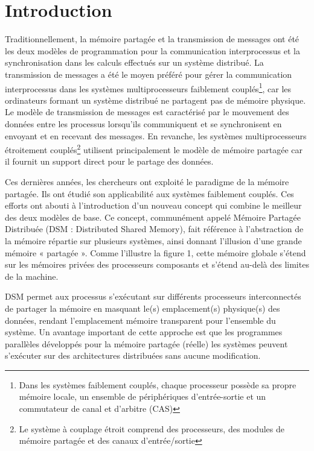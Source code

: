 \tableofcontents
\newpage
\baselineskip=18pt
\section{Introduction}
\setlength{\parindent}{5ex}
Traditionnellement, la mémoire partagée et la transmission de messages ont été les deux modèles de programmation pour la communication interprocessus et la synchronisation dans les calculs effectués sur un système distribué. La transmission de messages a été le moyen préféré pour gérer la communication interprocessus dans les systèmes multiprocesseurs faiblement couplés\footnote{Dans les systèmes faiblement couplés, chaque processeur possède sa propre mémoire locale, un ensemble de périphériques d’entrée-sortie et un commutateur de canal et d’arbitre (CAS)}, car les ordinateurs formant un système distribué ne partagent pas de mémoire physique. Le modèle de transmission de messages est caractérisé par le mouvement des données entre les
processus lorsqu'ils communiquent et se synchronisent en envoyant et en recevant des messages. En revanche, les systèmes multiprocesseurs étroitement couplés\footnote{Le système à couplage étroit comprend des processeurs, des modules de mémoire partagée et des canaux d’entrée/sortie} utilisent principalement le modèle de mémoire partagée car il fournit un support direct pour le partage des données.\par
Ces dernières années, les chercheurs ont exploité le paradigme de la mémoire partagée. Ils ont étudié son applicabilité aux systèmes faiblement couplés. Ces efforts ont abouti à l'introduction d'un nouveau concept qui combine le meilleur des deux modèles de base. Ce concept, communément appelé Mémoire Partagée Distribuée (DSM : Distributed Shared Memory), fait référence à l'abstraction de la mémoire répartie sur plusieurs systèmes, ainsi
donnant l'illusion d'une grande mémoire « partagée ». Comme l'illustre la figure 1, cette mémoire globale
s'étend sur les mémoires privées des processeurs composants et s'étend au-delà des limites de la machine.\par
DSM permet aux processus s'exécutant sur différents processeurs interconnectés de partager la mémoire en masquant le(s) emplacement(s) physique(s) des données, rendant l'emplacement mémoire transparent pour l'ensemble du système. Un avantage important de cette approche est que les programmes parallèles développés pour la mémoire partagée (réelle)
les systèmes peuvent s'exécuter sur des architectures distribuées sans aucune modification.\par
